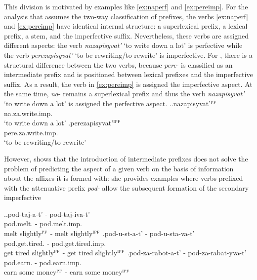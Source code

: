 This division is motivated by examples like \ref{ex:naperf} and \ref{ex:pereimp}. For the analysis that assumes the two-way classification of prefixes, the verbs \ref{ex:naperf} and \ref{ex:pereimp} have identical internal structure: a superlexical prefix, a lexical prefix, a stem, and the imperfective suffix. Nevertheless, these verbs are assigned different aspects: the verb \textit{nazapisyvat'} `to write down a lot' is perfective while the verb \textit{perezapisyvat'} `to be rewriting/to rewrite' is imperfective. For \citet{Tatevosov:07}, there is a structural difference between the two verbs, because \textit{pere}- is classified as an intermediate prefix and is positioned between lexical prefixes and the imperfective suffix. As a result, the verb in \ref{ex:pereimp} is assigned the imperfective aspect. At the same time, \textit{na}- remains a superlexical prefix and thus the verb \textit{nazapisyvat'} `to write down a lot' is assigned the perfective aspect.
\ex.\ag.\label{ex:naperf}nazapisyvat'$^{\textsc{pf}}$\\
na.za.write.imp.\\
`to write down a lot'
\bg.\label{ex:pereimp}perezapisyvat'$^{\textsc{ipf}}$\\
pere.za.write.imp.\\
`to be rewriting/to rewrite'

However, \cite{Kagan:book} shows that the introduction of intermediate prefixes does not solve the problem of predicting the aspect of a given verb on the basis of information about the affixes it is formed with: she provides examples where verbs prefixed with the attenuative prefix \textit{pod-} allow the subsequent formation of the secondary imperfective \citep[35, ex.~\ref{ex:pod} here]{Kagan:book}

\ex.\label{ex:pod}\ag.pod-taj-a-t' - pod-taj-iva-t'\\
pod.melt. - pod.melt.imp.\\
melt slightly$^{\textsc{pf}}$ - melt slightly$^{\textsc{ipf}}$
\bg.\label{ex:podustavat'}pod-u-st-a-t' - pod-u-sta-va-t'\\
pod.get.tired. - pod.get.tired.imp.\\
get tired slightly$^{\textsc{pf}}$ - get tired slightly$^{\textsc{ipf}}$
\bg.\label{ex:podzarabatyvat'}pod-za-rabot-a-t' - pod-za-rabat-yva-t'\\
pod.earn. - pod.earn.imp.\\
earn some money$^{\textsc{pf}}$ - earn some money$^{\textsc{ipf}}$

